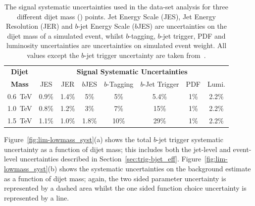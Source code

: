 \begin{table}[!htb]
  \centering
  \begin{tabular}{|c||c|c|c|c|c|c|c|}
    \hline
    \textbf{Dijet}   & \multicolumn{7}{c|}{\textbf{Signal Systematic Uncertainties}}                    \\ \cline{2-8} 
    \textbf{Mass}    & JES   & JER   & $b$JES  & $b$-Tagging & $b$-Jet Trigger & PDF & Lumi.        \\
    \hline                                                                        
    0.6~TeV          & 0.9\% & 1.4\% & 5\%     &     5\%     &      5.4\%   & 1\% & 2.2\%       \\
    1.0~TeV          & 0.8\% & 1.2\% & 3\%     &     7\%     &       15\%   & 1\% & 2.2\%       \\
    1.5~TeV          & 1.1\% & 1.0\% & 1.8\%    &    10\%     &       29\%   & 1\% & 2.2\%       \\
    \hline
  \end{tabular}
  \caption[The signal systematic uncertainties used in the \lm{} data-set analysis.]
          {The signal systematic uncertainties used in the \lm{} data-set analysis
           for three different dijet mass (\mjj{}) points.
          Jet Energy Scale (JES), Jet Energy Resolution (JER) and $b$-jet Energy Scale ($b$JES)
          are uncertainties on the dijet mass of a simulated event,
          whilst $b$-tagging, $b$-jet trigger, PDF and luminosity uncertainties are uncertainties on simulated event weight.
          All values except the $b$-jet trigger uncertainty are taken from~\cite{dibjet-full}.}
  \label{tab:lim-lowmass_syst}
  \end{table}

\newpage
Figure~\ref{fig:lim-lowmass_syst}(a) shows the total $b$-jet trigger systematic uncertainty as a function of dijet  mass;
this includes both the jet-level and event-level uncertainties described in Section~\ref{sec:trig-bjet_eff}.
Figure~\ref{fig:lim-lowmass_syst}(b) shows the systematic uncertainties on the background estimate as a function of dijet  mass;
again, the two sided parameter uncertainty is represented by a dashed area
whilst the one sided function choice uncertainty is represented by a line.

